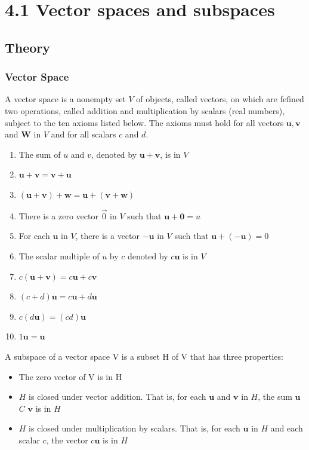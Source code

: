 \section*{4.1 Vector spaces and subspaces}
  \subsection*{Theory}

    \subsubsection*{Vector Space}
    \begin{mydef}\label{vector space}
      A vector space is a nonempty set $ V $ of objects, called vectors, on which are fefined two operations, called addition and multiplication by scalars (real numbers), subject to the ten axioms listed below. The axioms must hold for all vectors $ \mathbf u, \mathbf v $ and  $ \mathbf W $ in $ V $ and for all scalars $ c $ and $ d $.
      \begin{enumerate}
        \item The sum of $ u $ and $ v $, denoted by $ \mathbf u + \mathbf v $, is in $ V $
        \item $ \mathbf u + \mathbf v = \mathbf v + \mathbf u $
        \item $ (\mathbf u + \mathbf v) + \mathbf w = \mathbf u + (\mathbf v + \mathbf w)  $
        \item There is a zero vector $ \vec{0} $ in $ V $ such that $ \mathbf u + \mathbf 0 = u $
        \item For each $ \mathbf u $ in $ V $, there is a vector $ - \mathbf u $ in $ V $ such that $ \mathbf u + (-\mathbf u) = 0 $
        \item The scalar multiple of $ u $ by $ c $ denoted by $ c \mathbf u $ is in $ V $
        \item $ c (\mathbf{u + v}) = c \mathbf u + c \mathbf v $
        \item $ (c+d)\mathbf u = c \mathbf u + d \mathbf u $
        \item $ c(d \mathbf u) = (cd) \mathbf u $
        \item $ 1 \mathbf u  = \mathbf u $
      \end{enumerate}


    \end{mydef}

    \begin{mydef}\label{subspace}
      A subspace of a vector space V is a subset H of V that has three properties:
      \begin{itemize}
        \item The zero vector of V is in H
        \item $H$ is closed under vector addition. That is, for each $  \mathbf  u $ and $ \mathbf  v$ in $H$, the sum $ \mathbf  u$ $C$ $ \mathbf  v$
        is in $H$
        \item $H$ is closed under multiplication by scalars. That is, for each $ \mathbf  u$ in $H$ and each
        scalar $c$, the vector $c \mathbf  u$ is in $H$        
      \end{itemize}
    \end{mydef}

